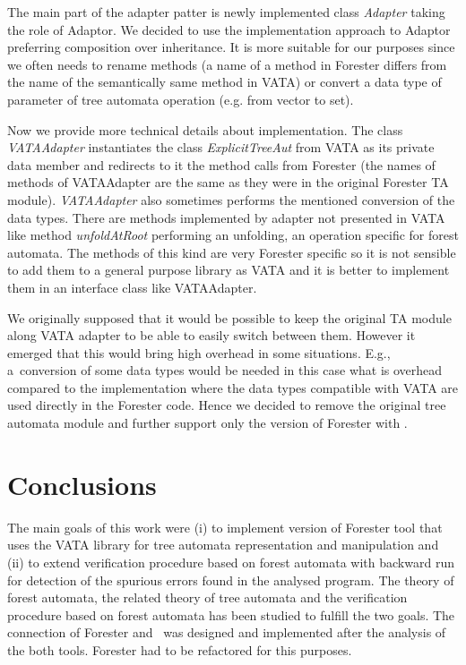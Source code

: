 \documentclass[fleqn,11pt]{ExcelAtFIT} %
\begin{document}
The main part of the adapter patter is newly implemented class \emph{Adapter} taking the role of Adaptor.
We decided to use the implementation approach to Adaptor preferring composition over inheritance.
It is more suitable for our purposes since we often needs to rename methods 
(a name of a method in Forester differs from the name of the semantically same method in VATA)
or convert a data type of parameter of tree automata operation (e.g. from vector to set). 

Now we provide more technical details about implementation.
The class \emph{VATAAdapter} instantiates the class \emph{ExplicitTreeAut} from VATA as its private data member
and redirects to it the method calls from Forester (the names of methods of VATAAdapter are the same as they were
in the original Forester TA module).
\emph{VATAAdapter} also sometimes performs the mentioned conversion of the data types.
There are methods implemented by adapter not presented in VATA like method \emph{unfoldAtRoot}
performing an unfolding, an operation specific for forest automata.
The methods of this kind are very Forester specific so it is not sensible to add them to a general purpose library as VATA
and it is better to implement them in an interface class like VATAAdapter.

We originally supposed that it would be possible to keep the original TA module along VATA adapter
to be able to easily switch between them.
However it emerged that this would bring high overhead in some situations.
E.g., a~conversion of some data types would be needed in this case
what is overhead compared to the implementation where the data types compatible with VATA are used directly in the Forester code.
Hence we decided to remove the original tree automata module and further support only the version of Forester with \vata.

\section{Conclusions}
\label{sec:concl}

The main goals of this work were (i) to implement version of Forester tool that uses the VATA library for tree automata representation and manipulation
and (ii) to extend verification procedure based on forest automata with backward run for detection of the spurious errors found in the analysed program.
The theory of forest automata, the related theory of tree automata and
the verification procedure based on forest automata has been studied to fulfill the two goals.
The connection of Forester and \vata\ was designed and implemented after the analysis of the both tools.
Forester had to be refactored for this purposes.
\end{document}
